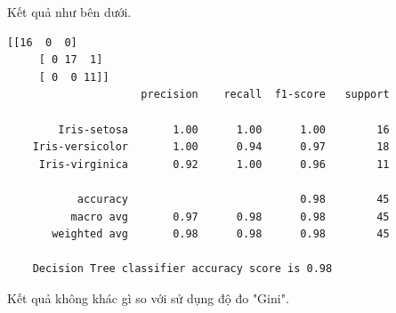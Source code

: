 \begin{enumerate}[label=(\alph*)]
    Kết quả như bên dưới.
    
    \begin{center}
    \begin{lstlisting}[basicstyle=\fontsize{11}{13}\selectfont\ttfamily]
    [[16  0  0]
     [ 0 17  1]
     [ 0  0 11]]
                     precision    recall  f1-score   support
    
        Iris-setosa       1.00      1.00      1.00        16
    Iris-versicolor       1.00      0.94      0.97        18
     Iris-virginica       0.92      1.00      0.96        11
    
           accuracy                           0.98        45
          macro avg       0.97      0.98      0.98        45
       weighted avg       0.98      0.98      0.98        45
    
    Decision Tree classifier accuracy score is 0.98
    \end{lstlisting}
    \end{center}

    Kết quả không khác gì so với sử dụng độ đo "Gini".
\end{enumerate}

